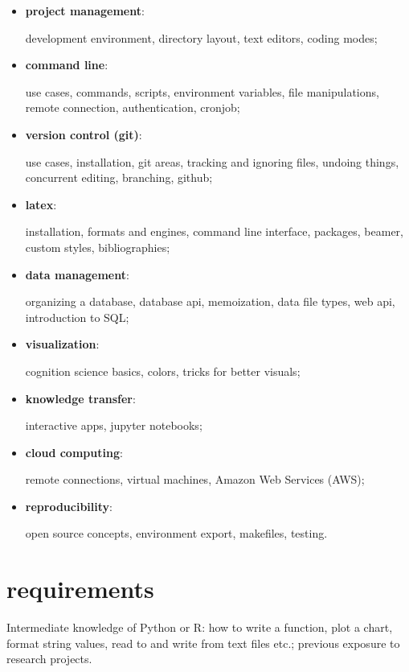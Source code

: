 \documentclass[12pt]{article}
\begin{document}
\begin{itemize}[topsep=0pt, itemsep=4pt, partopsep=0pt, parsep=0pt]
    \item \textbf{project management}:\par
        development environment, directory layout, text editors, coding modes;
    \item \textbf{command line}:\par
        use cases, commands, scripts, environment variables, file manipulations, remote connection, authentication, cronjob;
    \item \textbf{version control (git)}:\par
        use cases, installation, git areas, tracking and ignoring files, undoing things, concurrent editing, branching, github;
    \item \textbf{latex}:\par
        installation, formats and engines, command line interface, packages, beamer, custom styles, bibliographies;
    \item \textbf{data management}:\par
        organizing a database, database api, memoization, data file types, web api, introduction to SQL;
    \item \textbf{visualization}:\par
        cognition science basics, colors, tricks for better visuals;
    \item \textbf{knowledge transfer}:\par
        interactive apps, jupyter notebooks;
    \item \textbf{cloud computing}:\par
        remote connections, virtual machines, Amazon Web Services (AWS);
    \item \textbf{reproducibility}:\par
        open source concepts, environment export, makefiles, testing.
\end{itemize}


\section{requirements} %
\label{sec:requirements}

Intermediate knowledge of Python or R: how to write a function, plot a chart, format string values, read to and write from text files etc.; previous exposure to research projects.
\end{document}
